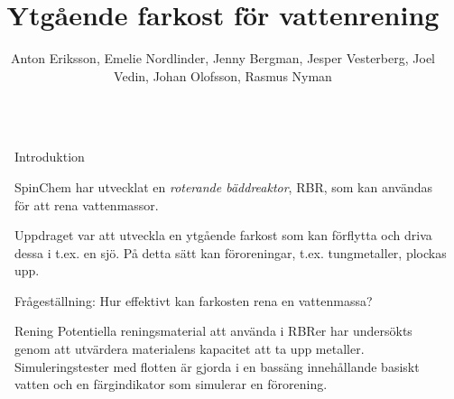 \documentclass[final]{beamer}
\title{Ytgående farkost för vattenrening}
\author{Anton Eriksson, Emelie Nordlinder, Jenny Bergman,
  Jesper Vesterberg, Joel Vedin, Johan Olofsson, Rasmus Nyman}
\institute{Design-Build-Test Grupp 5, Umeå Universitet}
\newlength{\onecolwid}
\begin{document}

\setlength{\belowcaptionskip}{2ex} %
\setlength\belowdisplayshortskip{2ex} %

\begin{frame}[t]

  \begin{columns}[c]
    \begin{column}{\textwidth}
      \centering
      \vskip 1cm
      \vskip 2cm
    \end{column}
  \end{columns}

  \vspace{2cm}

  \begin{columns}[t, totalwidth=\textwidth]

    \begin{column}{0.0001\textwidth}\end{column} %

    \begin{column}{\onecolwid}

      \begin{block}{Introduktion}

        SpinChem har utvecklat en \emph{roterande bäddreaktor}, RBR,
        som kan användas för att rena vattenmassor.

        Uppdraget var att utveckla
        en ytgående farkost som kan förflytta och driva dessa i t.ex. en sjö.
        På detta sätt kan föroreningar, t.ex. tungmetaller, plockas upp.

        Frågeställning: Hur effektivt kan farkosten rena en vattenmassa?

      \end{block}

      \begin{block}{Rening}
        Potentiella reningsmaterial att använda i RBRer har undersökts genom att
        utvärdera materialens kapacitet att ta upp metaller. Simuleringstester
        med flotten är gjorda i en bassäng innehållande basiskt vatten och en
        färgindikator som simulerar en förorening.


\end{block}
\end{column}
\end{columns}
\end{frame}
\end{document}
